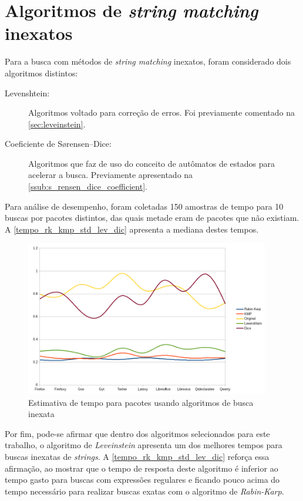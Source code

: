 \section{Algoritmos de \textit{string matching} inexatos} %
\label{sec:algor_timos_de_string_matching_inexatos}

Para a busca com métodos de \textit{string matching} inexatos, foram considerado dois algoritmos distintos:

\begin{description}
	\item[Levenshtein:] Algoritmos voltado para correção de erros. Foi previamente comentado na \autoref{sec:leveinstein}.
	\item[Coeficiente de Sørensen–Dice:] Algoritmos que faz de uso do conceito de autômatos de estados para acelerar a busca. Previamente apresentado na \autoref{ssub:s_rensen_dice_coefficient}.
\end{description}



Para análise de desempenho, foram coletadas 150 amostras de tempo para 10 buscas por pacotes distintos, das quais metade eram de pacotes que não existiam. A \autoref{tempo_rk_kmp_std_lev_dic} apresenta a mediana destes tempos.

\begin{figure}[htbp]
  \centering
  \includegraphics[width=0.95\textwidth]{figuras/tempo-rk_kmp_std_lev_dice}
  \caption{Estimativa de tempo para pacotes usando algoritmos de busca inexata}
  \label{tempo_rk_kmp_std_lev_dic}
\end{figure}


Por fim, pode-se afirmar que dentro dos algoritmos selecionados para este trabalho, o algoritmo de \textit{Leveinstein} apresenta um dos melhores tempos para buscas inexatas de \textit{strings}. A \autoref{tempo_rk_kmp_std_lev_dic} reforça essa afirmação, ao mostrar que o tempo de resposta deste algoritmo é inferior ao tempo gasto para buscas com expressões regulares e ficando pouco acima do tempo necessário para realizar buscas exatas com o algoritmo de  \textit{Rabin-Karp}.